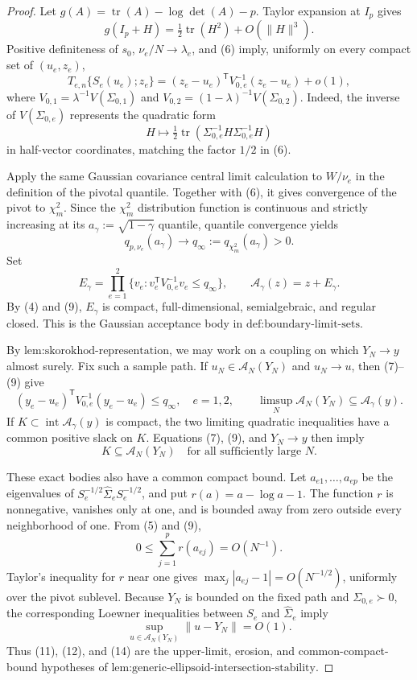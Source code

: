 \documentclass{article}
\begin{document}
\begin{proof}
Let \(g(A)=\operatorname{tr}(A)-\log\det(A)-p\). Taylor expansion at \(I_p\) gives
\[
 g(I_p+H)=\tfrac12\operatorname{tr}(H^2)+O(\|H\|^3).
 \tag{6}
\]
Positive definiteness of \(s_0\), \(\nu_e/N\to\lambda_e\), and (6) imply, uniformly on every compact set of \((u_e,z_e)\),
\[
 T_{e,n}\{S_e(u_e);z_e\}
 =(z_e-u_e)^{\mathsf T}V_{0,e}^{-1}(z_e-u_e)+o(1),
 \tag{7}
\]
where \(V_{0,1}=\lambda^{-1}V(\Sigma_{0,1})\) and \(V_{0,2}=(1-\lambda)^{-1}V(\Sigma_{0,2})\). Indeed, the inverse of \(V(\Sigma_{0,e})\) represents the quadratic form
\[
 H\longmapsto\tfrac12
 \operatorname{tr}(\Sigma_{0,e}^{-1}H\Sigma_{0,e}^{-1}H)
 \tag{8}
\]
in half-vector coordinates, matching the factor \(1/2\) in (6).

Apply the same Gaussian covariance central limit calculation to \(W/\nu_e\) in the definition of the pivotal quantile. Together with (6), it gives convergence of the pivot to \(\chi_m^2\). Since the \(\chi_m^2\) distribution function is continuous and strictly increasing at its \(a_\gamma:=\sqrt{1-\gamma}\) quantile, quantile convergence yields
\[
 q_{p,\nu_e}(a_\gamma)\longrightarrow
 q_\infty:=q_{\chi_m^2}(a_\gamma)>0.
 \tag{9}
\]
Set
\[
 E_\gamma=\prod_{e=1}^2
 \{v_e:v_e^{\mathsf T}V_{0,e}^{-1}v_e\le q_\infty\},
 \qquad
 \mathcal A_\gamma(z)=z+E_\gamma.
 \tag{10}
\]
By (4) and (9), \(E_\gamma\) is compact, full-dimensional, semialgebraic, and regular closed. This is the Gaussian acceptance body in \(\text{def:boundary-limit-sets}\).

By \(\text{lem:skorokhod-representation}\), we may work on a coupling on which \(Y_N\to y\) almost surely. Fix such a sample path. If \(u_N\in\mathcal A_N(Y_N)\) and \(u_N\to u\), then (7)--(9) give
\[
 (y_e-u_e)^{\mathsf T}V_{0,e}^{-1}(y_e-u_e)\le q_\infty,
 \quad e=1,2,
 \qquad
 \limsup_N\mathcal A_N(Y_N)\subseteq\mathcal A_\gamma(y).
 \tag{11}
\]
If \(K\subset\operatorname{int}\mathcal A_\gamma(y)\) is compact, the two limiting quadratic inequalities have a common positive slack on \(K\). Equations (7), (9), and \(Y_N\to y\) then imply
\[
 K\subseteq\mathcal A_N(Y_N)
 \quad\text{for all sufficiently large }N.
 \tag{12}
\]

These exact bodies also have a common compact bound. Let \(a_{e1},\ldots,a_{ep}\) be the eigenvalues of \(S_e^{-1/2}\widehat\Sigma_eS_e^{-1/2}\), and put \(r(a)=a-\log a-1\). The function \(r\) is nonnegative, vanishes only at one, and is bounded away from zero outside every neighborhood of one. From (5) and (9),
\[
 0\le\sum_{j=1}^p r(a_{ej})=O(N^{-1}).
 \tag{13}
\]
Taylor's inequality for \(r\) near one gives \(\max_j|a_{ej}-1|=O(N^{-1/2})\), uniformly over the pivot sublevel. Because \(Y_N\) is bounded on the fixed path and \(\Sigma_{0,e}\succ0\), the corresponding Loewner inequalities between \(S_e\) and \(\widehat\Sigma_e\) imply
\[
 \sup_{u\in\mathcal A_N(Y_N)}\|u-Y_N\|=O(1).
 \tag{14}
\]
Thus (11), (12), and (14) are the upper-limit, erosion, and common-compact-bound hypotheses of \(\text{lem:generic-ellipsoid-intersection-stability}\).


\end{proof}
\end{document}
